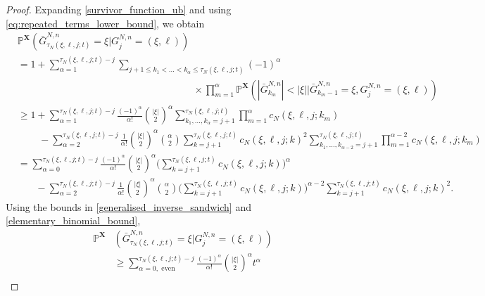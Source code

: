 \documentclass[a4paper,11pt]{article}
\theoremstyle{definition}
\newcommand{\bbP}{\mathbb{P}}
\newcommand{\bfX}{\mathbf{X}}
\begin{document}
\begin{proof}
Expanding \eqref{survivor_function_ub} and using \eqref{eq:repeated_terms_lower_bound}, we obtain
\begin{align*}
&\bbP^{ \bfX }(  \bar{ G }_{ \tau_N( \xi, \ell, j; t ) }^{ N, n } = \xi | G_j^{ N, n } = ( \xi, \ell ) ) \\
&= 1 + \sum_{ \alpha = 1 }^{ \tau_N( \xi, \ell, j; t ) - j } \sum_{ j + 1 \leq k_1 < \ldots < k_{ \alpha } \leq \tau_N( \xi, \ell, j; t ) }  ( -1 )^{ \alpha } \\
&\phantom{= 1 + \sum_{ \alpha = 1 }^{ \tau_N( \xi, \ell, j; t ) - j } \sum_{ j + 1 \leq k_1 < \ldots < k_{ \alpha }}} \times \prod_{ m = 1 }^{ \alpha } \bbP^{ \bfX }( | \bar{ G }_{ k_m }^{ N, n } | < | \xi | | \bar{ G }_{ k_m - 1 }^{ N, n } = \xi, G_j^{ N, n } = ( \xi, \ell ) ) \\
&\geq 1 + \sum_{ \alpha = 1 }^{ \tau_N( \xi, \ell, j; t ) - j } \frac{ ( -1 )^{ \alpha } }{ \alpha ! } \binom{ | \xi | }{ 2 }^{ \alpha } \sum_{ k_1, \ldots, k_{ \alpha } = j + 1 }^{ \tau_N( \xi, \ell, j; t ) } \prod_{ m = 1 }^{ \alpha } c_N( \xi, \ell, j; k_m ) \\
&\phantom{\geq 1}\,\, - \sum_{ \alpha = 2 }^{ \tau_N( \xi, \ell, j; t ) - j } \frac{ 1 }{ \alpha ! } \binom{ | \xi | }{ 2 }^{ \alpha } \binom{ \alpha }{ 2 } \sum_{ k = j + 1 }^{ \tau_N( \xi, \ell, j; t ) } c_N( \xi, \ell, j; k )^2  \sum_{ k_1, \ldots, k_{ \alpha - 2 } = j + 1 }^{ \tau_N( \xi, \ell, j; t ) } \prod_{ m = 1 }^{ \alpha - 2 } c_N( \xi, \ell, j; k_m ) \\
&= \sum_{ \alpha = 0 }^{ \tau_N( \xi, \ell, j; t ) - j } \frac{ ( -1 )^{ \alpha } }{ \alpha ! } \binom{ | \xi | }{ 2 }^{ \alpha } \Bigg( \sum_{ k = j + 1 }^{ \tau_N( \xi, \ell, j; t ) }  c_N( \xi, \ell, j; k ) \Bigg)^{ \alpha } \\
&\phantom{\geq 1} - \sum_{ \alpha = 2 }^{ \tau_N( \xi, \ell, j; t ) - j } \frac{ 1 }{ \alpha ! } \binom{ | \xi | }{ 2 }^{ \alpha } \binom{ \alpha }{ 2 } \Bigg( \sum_{ k = j + 1 }^{ \tau_N( \xi, \ell, j; t ) } c_N( \xi, \ell, j; k ) \Bigg)^{ \alpha - 2 } \sum_{ k = j + 1 }^{ \tau_N( \xi, \ell, j; t ) } c_N( \xi, \ell, j; k )^2.
\end{align*}
Using the bounds in \eqref{generalised_inverse_sandwich} and \eqref{elementary_binomial_bound}, 
\begin{align*}
\bbP^{ \bfX }&(  \bar{ G }_{ \tau_N( \xi, \ell, j; t ) }^{ N, n } = \xi | G_j^{ N, n } = ( \xi, \ell ) ) \\
&\geq \sum_{ \alpha = 0, \text{ even} }^{ \tau_N( \xi, \ell, j; t ) - j } \frac{ ( -1 )^{ \alpha } }{ \alpha ! } \binom{ | \xi | }{ 2 }^{ \alpha } t^{ \alpha } \\

\end{align*}
\end{proof}
\end{document}
